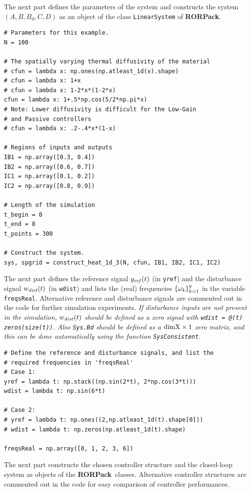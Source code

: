 \documentclass[11pt, a4paper]{amsart}
\theoremstyle{definition}
\numberwithin{equation}{section}
\newcommand{\yref}{y_{\mbox{\scriptsize\textit{ref}}}}
\newcommand{\wdist}{w_{\mbox{\scriptsize\textit{dist}}}}
\newcommand{\RORname}{\textbf{RORPack}}
\begin{document}
 The next part defines the parameters of the system and constructs the system $(A,B,B_d,C,D)$ as an object of the class \texttt{LinearSystem} of \RORname.

\begin{lstlisting}
# Parameters for this example.
N = 100

# The spatially varying thermal diffusivity of the material
# cfun = lambda x: np.ones(np.atleast_1d(x).shape)
# cfun = lambda x: 1+x
# cfun = lambda x: 1-2*x*(1-2*x)
cfun = lambda x: 1+.5*np.cos(5/2*np.pi*x)
# Note: Lower diffusivity is difficult for the Low-Gain
# and Passive controllers
# cfun = lambda x: .2-.4*x*(1-x)

# Regions of inputs and outputs
IB1 = np.array([0.3, 0.4])
IB2 = np.array([0.6, 0.7])
IC1 = np.array([0.1, 0.2])
IC2 = np.array([0.8, 0.9])

# Length of the simulation
t_begin = 0
t_end = 8
t_points = 300

# Construct the system.
sys, spgrid = construct_heat_1d_3(N, cfun, IB1, IB2, IC1, IC2)
  \end{lstlisting}

The next part defines the reference signal $\yref(t)$ (in \texttt{yref}) and the disturbance signal $\wdist(t)$ (in \texttt{wdist}) and lists the (real) frequencies $\{\omega_k\}_{k=1}^q$ in the variable \texttt{freqsReal}. Alternative reference and disturbance signals are commented out in the code for further simulation experiments.
\emph{If disturbance inputs are not present in the simulation, $\wdist(t)$ should be defined as a zero signal with \textup{\texttt{wdist = @(t) zeros(size(t))}}. Also \textup{\texttt{Sys.Bd}} should be defined as a $\textup{dimX}\times 1$ zero matrix, and this can be done automatically using the function \textup{\texttt{SysConsistent}}.}

\begin{lstlisting}
# Define the reference and disturbance signals, and list the
# required frequencies in 'freqsReal'
# Case 1:
yref = lambda t: np.stack((np.sin(2*t), 2*np.cos(3*t)))
wdist = lambda t: np.sin(6*t)

# Case 2:
# yref = lambda t: np.ones((2,np.atleast_1d(t).shape[0]))
# wdist = lambda t: np.zeros(np.atleast_1d(t).shape)

freqsReal = np.array([0, 1, 2, 3, 6])
\end{lstlisting}

The next part constructs the chosen controller structure and the closed-loop system as objects of the \RORname\ classes. Alternative controller structures are commented out in the code for easy comparison of controller performances.
\end{document}
